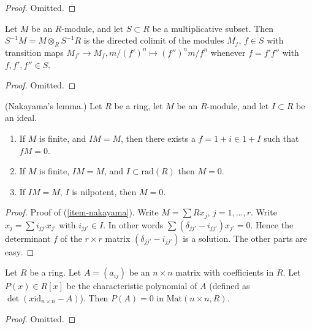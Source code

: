 \begin{proof}
Omitted.
\end{proof}

\begin{lemma}
\label{lemma-localize-colimit}
Let $M$ be an $R$-module, and let $S \subset R$ be
a multiplicative subset. Then $S^{-1}M = M\otimes_R S^{-1}R$
is the directed colimit of the modules $M_f$, $f\in S$ with
transition maps $M_{f'} \to M_f, m/(f')^n \mapsto (f'')^n m/f^n$
whenever $f = f' f''$ with $f, f', f''\in S$.
\end{lemma}

\begin{proof}
Omitted.
\end{proof}

\begin{lemma}
\label{lemma-NAK}
(Nakayama's lemma.)
Let $R$ be a ring, let $M$ be an $R$-module, and let $I \subset R$
be an ideal.
\begin{enumerate}
\item If $M$ is finite, and $IM = M$, then there exists a
$f = 1 + i \in 1 + I$ such that $fM = 0$.
\label{item-nakayama}
\item If $M$ is finite, $IM = M$, and $I \subset \text{rad}(R)$
then $M = 0$.
\item If $IM = M$, $I$ is nilpotent, then $M = 0$.
\end{enumerate}
\end{lemma}

\begin{proof}
Proof of (\ref{item-nakayama}). Write $M = \sum Rx_j$, $j = 1, \ldots, r$.
Write $x_j = \sum i_{jj'} x_{j'}$ with $i_{jj'} \in I$.
In other words $\sum (\delta_{jj'} - i_{jj'})x_{j'} = 0$.
Hence the determinant $f$ of the $r\times r$ matrix
$(\delta_{jj'} - i_{jj'})$ is a solution. The other parts are easy.
\end{proof}


\begin{lemma}
\label{lemma-charpoly}
Let $R$ be a ring. Let $A = (a_{ij})$ be an $n\times n$
matrix with coefficients in $R$. Let $P(x) \in R[x]$
be the characteristic polynomial of $A$ (defined
as $\det(x\text{id}_{n\times n} - A)$).
Then $P(A) = 0$ in $\text{Mat}(n\times n, R)$.
\end{lemma}

\begin{proof}
Omitted.
\end{proof}




















